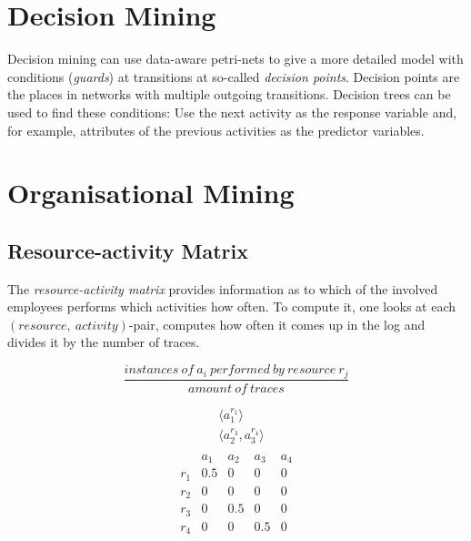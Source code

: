 \documentclass[english]{panikzettel}
\begin{document}
\section{Decision Mining}

Decision mining can use data-aware petri-nets to give a more detailed model with conditions (\emph{guards}) at transitions at so-called \emph{decision points}.
Decision points are the places in networks with multiple outgoing transitions.
Decision trees can be used to find these conditions: Use the next activity as the response variable and, for example, attributes of the previous activities as the predictor variables.

\section{Organisational Mining}

\subsection{Resource-activity Matrix}

\begin{halfboxl}
The \textit{resource-activity matrix} provides information as to which of the involved employees performs which activities how often. To compute it, one looks at each \((resource, \: activity)\)-pair, computes how often it comes up in the log and divides it by the number of traces.

\[\frac{instances \: of \: a_i \: performed \: by \: resource \: r_j}{amount \: of \: traces}\]
\end{halfboxl}%
\begin{halfboxr}
\vspace{-\baselineskip}
\begin{align*}
    & \langle a_1^{r_1} \rangle \\
    & \langle a_2^{r_3},a_3^{r_4} \rangle \\
\end{align*}
\[\begin{array}{c|c|c|c|c}
        & a_1   & a_2   & a_3   & a_4   \\ \hline
    r_1 & 0.5   & 0     & 0     & 0     \\ \hline
    r_2 & 0     & 0     & 0     & 0     \\ \hline
    r_3 & 0     & 0.5   & 0     & 0     \\ \hline
    r_4 & 0     & 0     & 0.5   & 0     \\
\end{array}\]
\end{halfboxr}
\end{document}
